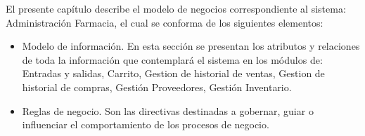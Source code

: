 
El presente capítulo describe el modelo de negocios correspondiente al sistema: Administración Farmacia, el cual se conforma de los siguientes elementos:

\begin{itemize}
    \item Modelo de información. En esta sección se presentan los atributos y relaciones de toda la información que contemplará el sistema en los módulos de: Entradas y salidas, Carrito, Gestion de historial de ventas, Gestion de historial de compras, Gestión Proveedores, Gestión Inventario.

    \item Reglas de negocio. Son las directivas destinadas a gobernar, guiar o influenciar el comportamiento de los procesos de negocio.
\end{itemize}

